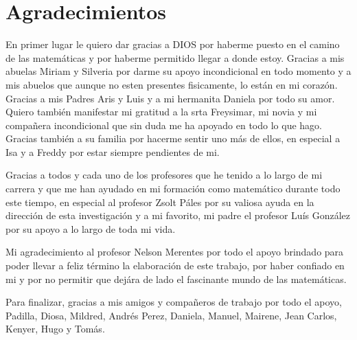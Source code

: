 \chapter*{Agradecimientos}
\vspace{1cm}

En primer lugar le quiero dar gracias a DIOS por haberme
puesto en el camino de las  matem\'aticas y por haberme permitido
llegar a donde estoy. Gracias a mis abuelas Miriam y Silveria por 
darme su apoyo incondicional en todo momento y a mis abuelos que aunque
no esten presentes fisicamente, lo están en mi corazón. 
Gracias a mis Padres Aris y Luis
y a mi hermanita Daniela por todo su amor. Quiero tambi\'en manifestar mi
gratitud a la srta Freysimar, mi novia y mi compañera incondicional
que sin duda me ha apoyado en todo lo que hago. Gracias también a su 
familia por hacerme sentir uno más de ellos, en especial a Isa y a Freddy
por estar siempre pendientes de mi. 

Gracias a todos y cada uno de los profesores que he tenido a lo largo
de mi carrera y que me han ayudado en mi formación como matemático durante
todo este tiempo, en especial al profesor Zsolt Páles por su valiosa ayuda 
en la dirección de esta investigación y a mi favorito, mi padre el profesor 
Luís González por su apoyo a lo largo de toda mi vida. 

Mi agradecimiento al profesor Nelson Merentes por todo el apoyo brindado 
para poder llevar a feliz término la elaboración de este trabajo, por
haber confiado en mi y por no permitir que dejára de lado el fascinante mundo de
las matemáticas.

Para finalizar, gracias a mis amigos y compañeros de trabajo por todo el apoyo,
Padilla, Diosa, Mildred, Andrés Perez, Daniela, Manuel, Mairene, Jean Carlos,
Kenyer, Hugo y Tomás.    



 

  



 \newpage